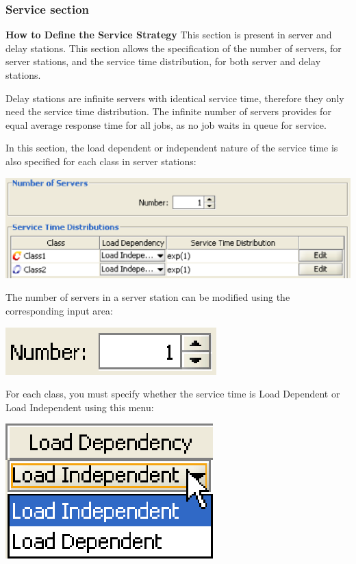 \subsubsection{Service section}
\label{sec:ServiceSection}
\textbf{How to Define the Service Strategy}
This section is present in server and delay stations.
This section allows the specification of the number of servers, for server stations, and the service time distribution, for both server and delay stations.

Delay stations are infinite servers with identical service time, therefore they only need the service time distribution. The infinite number of servers provides for equal average response time for all jobs, as no job waits in queue for service.

In this section, the load dependent or independent nature of the service time is also specified for each class in server stations:
\begin{center}
\includegraphics[scale=.5]{img/jsim/service_section1.eps}
\end{center}
The number of servers in a server station can be modified using the corresponding input area:
\begin{center}
\includegraphics[scale=.5]{img/jsim/num_servers.eps}
\end{center}
For each class, you must specify whether the service time is Load Dependent or Load Independent using this menu:
\begin{center}
\includegraphics[scale=.5]{img/jsim/load.eps}
\end{center}
